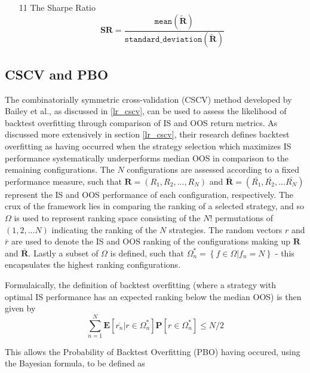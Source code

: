 \documentclass[a4paper,11pt,oneside]{article}
\theoremstyle{plain}
\theoremstyle{definition}
\begin{document}
\begin{itemize}
			\item [11] The Sharpe Ratio
				\begin{equation}
					\mathbf{SR} = \frac{\mathtt{mean}(\mathbf{\tilde{R}})}{\mathtt{standard\_deviation}(\mathbf{\tilde{R}})} 
				\end{equation}
		
	\end{itemize}
	\hfill\break

	\subsection{CSCV and PBO}\label{imp_cscv}
	
	The  combinatorially symmetric cross-validation (CSCV) method developed by Bailey et al., as discussed in \ref{lr_cscv}, can be used to assess the likelihood of backtest overfitting through comparison of IS and OOS return metrics. As discussed more extensively in section \ref{lr_cscv}, their research defines backtest overfitting as having
	occurred when the strategy selection which maximizes IS performance systematically underperforms median OOS in comparison to the remaining configurations. The $N$  configurations are assessed according to a fixed performance measure, such that $\mathbf{R} = (R_1, R_2, ..., R_N)$ and $\mathbf{\bar{R}} = (\bar{R_1}, \bar{R_2},... \bar{R_N})$ represent the IS and OOS performance of each configuration, respectively. The crux of the framework lies in comparing the ranking of a selected strategy, and so $\Omega$ is used to represent ranking space consisting of the $N!$ permutations of $(1,2,...N)$ indicating the ranking of the $N$ strategies. The random vectors $r$ and $\bar{r}$ are used to denote the IS and OOS ranking of the configurations making up $\mathbf{R}$ and $\mathbf{\bar{R}}$. Lastly a subset of $\Omega$ is defined, such that $\Omega_{n}^{*}=\left\{f \in \Omega | f_{n}=N\right\}$ - this encapsulates the highest ranking configurations. \newline
	
	
	Formulaically, the definition of backtest overfitting (where a strategy with optimal IS performance has an expected ranking below the median OOS) is then given by
	\begin{equation}\label{eq:PBO1}
	\sum_{n=1}^{N}\mathbf{E}[\overline{r_n}|r\in 
	\Omega_{n}^{*}]\mathbf{P}[r\in\Omega_{n}^{*}]\leq{N/2}
	\end{equation}
	
	This allows the Probability of Backtest Overfitting (PBO) having occured, using the Bayesian formula, to be defined as 
	
\end{document}
